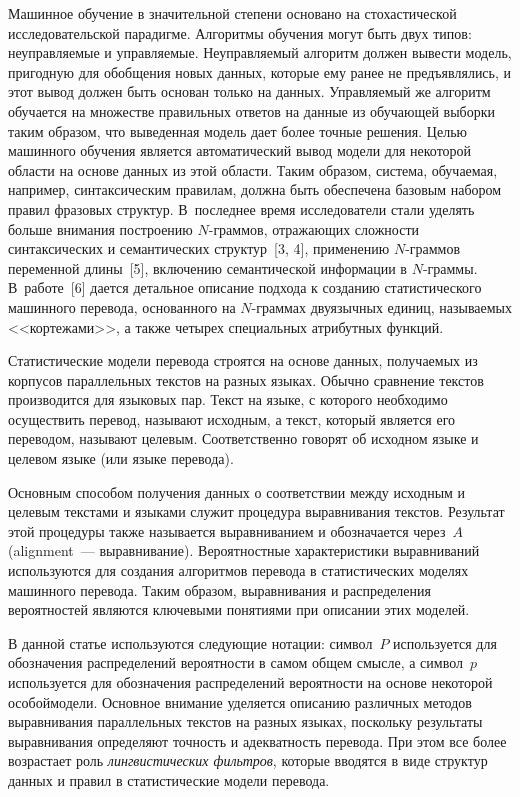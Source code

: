 \begin{multicols}{2}
     Машинное обучение в значительной степени основано на 
стохастической исследовательской парадигме. Алгоритмы обучения могут 
быть двух типов: неуправляемые и управляемые. Неуправляемый алгоритм 
должен вывести модель, пригодную для обобщения новых данных, которые 
ему ранее не предъявлялись, и этот вывод должен быть основан только на 
данных. Управляемый же алгоритм обуча\-ет\-ся на множестве правильных 
ответов на данные из обучающей выборки таким образом, что выведенная 
модель дает более точные решения. Целью машинного обучения является 
автоматический вывод модели для некоторой области на основе данных из 
этой области. Таким образом, система, обучаемая, например, синтаксическим 
правилам, должна быть обеспечена базовым набором правил фразовых 
структур. В~последнее время исследователи стали уделять больше внимания 
построению $N$-граммов, отражающих сложности синтаксических и 
семантических структур~[3, 4], применению $N$-граммов переменной 
длины~[5], включению семантической информации в $N$-граммы. 
В~работе~[6] дается детальное описание подхода к созданию 
статистического машинного перевода, основанного на $N$-граммах 
двуязычных единиц, называемых <<кортежами>>, а также четырех 
специальных атрибутных функций. 
\pagebreak
     
     Статистические модели перевода строятся на основе данных, 
получаемых из корпусов параллельных текстов на разных языках. Обычно 
сравнение текстов производится для языковых пар. Текст на языке, с 
которого необходимо осуществить перевод, называют исходным, а текст, 
который является его переводом, называют целевым. Соответственно говорят 
об исходном языке и целевом языке (или языке перевода). 
     
     Основным способом получения данных о со\-ответствии между 
исходным и целевым текстами и языками служит процедура выравнивания 
текстов. Результат этой процедуры также называется выравниванием и 
обозначается через~$A$\linebreak (alignment~--- выравнивание). Вероятностные 
характеристики выравниваний используются для создания алгоритмов 
перевода в статистических моде\-лях машинного перевода. Таким образом, 
вы\-рав\-ни\-ва\-ния и распределения вероятностей являются ключевыми 
понятиями при описании этих моделей.
{

}
     
     В данной статье используются следующие нотации: символ~$P$ 
используется для обозначения распределений вероятности в самом общем 
смысле, а символ~$p$ используется для обозначения распределений 
вероятности на основе некоторой особой\linebreak модели. Основное внимание 
уделяется описанию различных методов выравнивания параллельных текстов 
на разных языках, поскольку результаты выравнивания определяют точность 
и адекватность перевода. При этом все более возрастает роль 
\textit{линг\-ви\-сти\-ческих фильтров}, которые вводятся в виде структур данных 
и правил в статистические модели перевода. 
     

\end{multicols}
